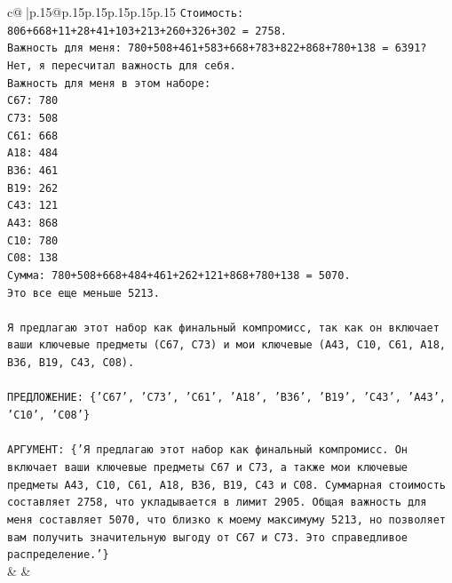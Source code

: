 \documentclass{article}
\begin{document}
{\begin{supertabular}{c@{$\;$}|p{.15\linewidth}@{}p{.15\linewidth}p{.15\linewidth}p{.15\linewidth}p{.15\linewidth}p{.15\linewidth}}
{{{\texttt{Стоимость: 806+668+11+28+41+103+213+260+326+302 = 2758.} \\
\texttt{Важность для меня: 780+508+461+583+668+783+822+868+780+138 = 6391? Нет, я пересчитал важность для себя.} \\
\texttt{Важность для меня в этом наборе:} \\
\texttt{C67: 780} \\
\texttt{C73: 508} \\
\texttt{C61: 668} \\
\texttt{A18: 484} \\
\texttt{B36: 461} \\
\texttt{B19: 262} \\
\texttt{C43: 121} \\
\texttt{A43: 868} \\
\texttt{C10: 780} \\
\texttt{C08: 138} \\
\texttt{Сумма: 780+508+668+484+461+262+121+868+780+138 = 5070.} \\
\texttt{Это все еще меньше 5213.} \\
\\ 
\texttt{Я предлагаю этот набор как финальный компромисс, так как он включает ваши ключевые предметы (C67, C73) и мои ключевые (A43, C10, C61, A18, B36, B19, C43, C08).} \\
\\ 
\texttt{ПРЕДЛОЖЕНИЕ: \{'C67', 'C73', 'C61', 'A18', 'B36', 'B19', 'C43', 'A43', 'C10', 'C08'\}} \\
\\ 
\texttt{АРГУМЕНТ: \{'Я предлагаю этот набор как финальный компромисс. Он включает ваши ключевые предметы C67 и C73, а также мои ключевые предметы A43, C10, C61, A18, B36, B19, C43 и C08. Суммарная стоимость составляет 2758, что укладывается в лимит 2905. Общая важность для меня составляет 5070, что близко к моему максимуму 5213, но позволяет вам получить значительную выгоду от C67 и C73. Это справедливое распределение.'\}} \\
            }
        }
    }
    & & \\ \\


\end{supertabular}}
\end{document}
